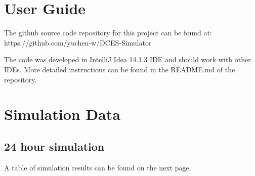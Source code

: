 \begin{appendices}
\label{Appendix}
\chapter{User Guide}
\label{Guide}

The github source code repository for this project can be found at: https://github.com/yuchen-w/DCES-Simulator

The code was developed in IntelliJ Idea 14.1.3 IDE and should work with other IDEs. More detailed instructions can be found in the README.md of the repository.

\chapter{Simulation Data}
\section{24 hour simulation}
A table of simulation results can be found on the next page.

\end{appendices}